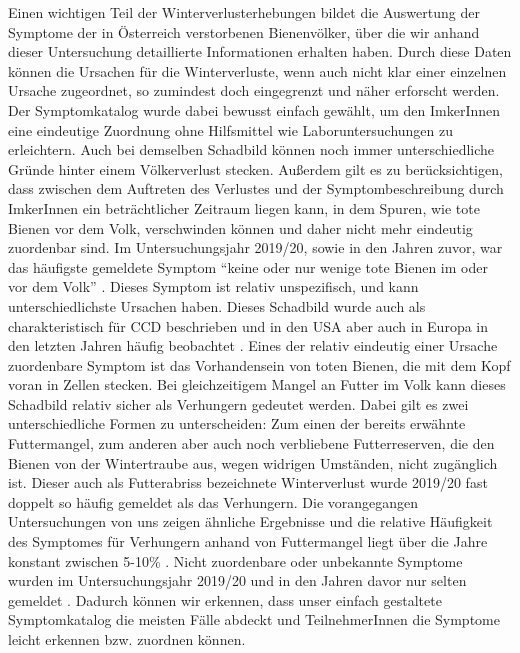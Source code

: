 Einen wichtigen Teil der Winterverlusterhebungen bildet die Auswertung der Symptome der in Österreich verstorbenen Bienenvölker, über die wir anhand dieser Untersuchung detaillierte Informationen erhalten haben. Durch diese Daten können die Ursachen für die Winterverluste, wenn auch nicht klar einer einzelnen Ursache zugeordnet, so zumindest doch eingegrenzt und näher erforscht werden. Der Symptomkatalog wurde dabei bewusst einfach gewählt, um den ImkerInnen eine eindeutige Zuordnung ohne Hilfsmittel wie Laboruntersuchungen zu erleichtern. Auch bei demselben Schadbild können noch immer unterschiedliche Gründe hinter einem Völkerverlust stecken. Außerdem gilt es zu berücksichtigen, dass zwischen dem Auftreten des Verlustes und der Symptombeschreibung durch ImkerInnen ein beträchtlicher Zeitraum liegen kann, in dem Spuren, wie tote Bienen vor dem Volk, verschwinden können und daher nicht mehr eindeutig zuordenbar sind.
\newline
Im Untersuchungsjahr 2019/20, sowie in den Jahren zuvor, war das häufigste gemeldete Symptom \enquote{keine oder nur wenige tote Bienen im oder vor dem Volk} \citep{crailsheim2018, brodschneider2018a, brodschneider2019b}.
Dieses Symptom ist relativ unspezifisch, und kann unterschiedlichste Ursachen haben. Dieses Schadbild wurde auch als charakteristisch für CCD beschrieben und in den USA aber auch in Europa \citep{dainat2012} in den letzten Jahren häufig beobachtet \citep{steinhauer2014, vanengelsdorp2008, vanengelsdorp2009, williams2010}.
\newline
Eines der relativ eindeutig einer Ursache zuordenbare Symptom ist das Vorhandensein von toten Bienen, die mit dem Kopf voran in Zellen stecken. Bei gleichzeitigem Mangel an Futter im Volk kann dieses Schadbild relativ sicher als Verhungern gedeutet werden. Dabei gilt es zwei unterschiedliche Formen zu unterscheiden: Zum einen der bereits erwähnte Futtermangel, zum anderen aber auch noch verbliebene Futterreserven, die den Bienen von der Wintertraube aus, wegen widrigen Umständen, nicht zugänglich ist. Dieser auch als Futterabriss bezeichnete Winterverlust wurde 2019/20 fast doppelt so häufig gemeldet als das Verhungern. Die vorangegangen Untersuchungen von uns zeigen ähnliche Ergebnisse und die relative Häufigkeit des Symptomes für Verhungern anhand von Futtermangel liegt über die Jahre konstant zwischen 5-10\% \citep{crailsheim2018, brodschneider2018a, brodschneider2019b}.
\newline
Nicht zuordenbare oder unbekannte Symptome wurden im Untersuchungsjahr 2019/20 und in den Jahren davor nur selten gemeldet \citep{crailsheim2018, brodschneider2018a, brodschneider2019b}. Dadurch können wir erkennen, dass unser einfach gestaltete Symptomkatalog die meisten Fälle abdeckt und TeilnehmerInnen die Symptome leicht erkennen bzw. zuordnen können.

